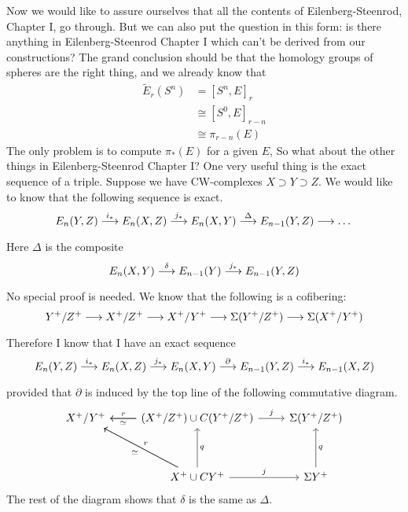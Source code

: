 \documentclass[../main]{subfiles}
\begin{document}
Now we would like to assure ourselves that all the contents of Eilenberg-Steenrod, Chapter I, go through. But we can also put the question in this form: is there anything in Eilenberg-Steenrod Chapter I which can't be derived from our constructions? The grand conclusion should be that the homology groups of spheres are the right thing, and we already know that
\begin{align}
    \widetilde{E}_r( S^n) &= [S^n, E]_r \nonumber \\
    &\cong [S^0, E]_{r-n} \nonumber \\
    &\cong \pi_{r-n}(E) \nonumber
\end{align}
The only problem is to compute $\pi_\ast(E)$ for a given $E$, So what about the other things in Eilenberg-Steenrod Chapter I? One very useful thing is the exact sequence of a triple. Suppose we have CW-complexes $X\supset Y\supset Z$. We would like to know that the following sequence is exact.
\[E_n(Y, Z)\vra{i_\ast} E_n(X, Z) \vra{j_\ast} E_n(X, Y) \vra{\Delta} E_{n-1}(Y, Z) \lra \dots\]
Here $\Delta$ is the composite
\[E_n(X,Y) \vra{\delta} E_{n-1}(Y)\vra{j_\ast} E_{n-1}(Y, Z)\]
No special proof is needed. We know that the following is a cofibering:
\[Y^+/Z^+ \vra{} X^+/Z^+\vra{}X^+/Y^+ \vra{} \Sigma(Y^+/Z^+) \vra{} \Sigma(X^+/Y^+)\]
Therefore I know that I have an exact sequence
\[E_n(Y,Z) \vra{i_\ast} E_n(X, Z)\vra{j_\ast}E_n(X, Y) \vra{\partial} E_{n-1}(Y, Z) \vra{i_\ast} E_{n-1}(X, Z)\]
provided that $\partial$ is induced by the top line of the following commutative diagram.
\[\begin{tikzcd}
	{X^+/Y^+} & {(X^+/Z^+)\cup C(Y^+/Z^+)} & {\Sigma(Y^+/Z^+)} \\
	\\
	& {X^+\cup CY^+} & {\Sigma Y^+}
	\arrow["j", from=1-2, to=1-3]
	\arrow["r"', from=1-2, to=1-1]
	\arrow["\simeq", from=1-2, to=1-1]
	\arrow["q"', from=3-2, to=1-2]
	\arrow["\simeq", from=3-2, to=1-1]
	\arrow["j", from=3-2, to=3-3]
	\arrow["q"', from=3-3, to=1-3]
	\arrow["r"', from=3-2, to=1-1]
\end{tikzcd}\]
The rest of the diagram shows that $\delta$ is the same as $\Delta$.
\end{document}
